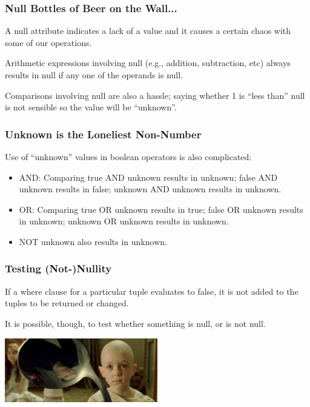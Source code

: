 \begin{frame}
\frametitle{Null Bottles of Beer on the Wall...}

A null attribute indicates a lack of a value and it causes a certain chaos with some of our operations.

Arithmetic expressions involving null (e.g., addition, subtraction, etc) always results in null if any one of the operands is null. 

Comparisons involving null are also a hassle; saying whether 1 is ``less than'' null is not sensible so the value will be ``unknown''.

\end{frame}



\begin{frame}
\frametitle{Unknown is the Loneliest Non-Number}

Use of ``unknown'' values in boolean operators is also complicated:

\begin{itemize}
	\item  AND: Comparing true AND unknown results in unknown; false AND unknown results in false; unknown AND unknown results in unknown. \\[3em]
	\item OR: Comparing true OR unknown results in true; false OR unknown results in unknown; unknown OR unknown results in unknown. \\[3em]
	\item NOT unknown also results in unknown.
\end{itemize}

\end{frame}



\begin{frame}
\frametitle{Testing (Not-)Nullity}

If a where clause for a particular tuple evaluates to false, it is not added to the tuples to be returned or changed. 

It is possible, though, to test whether something is null, or is not null. 

\begin{center}
	\includegraphics[width=0.5\textwidth]{images/nospoon.jpg}
\end{center}



\end{frame}



